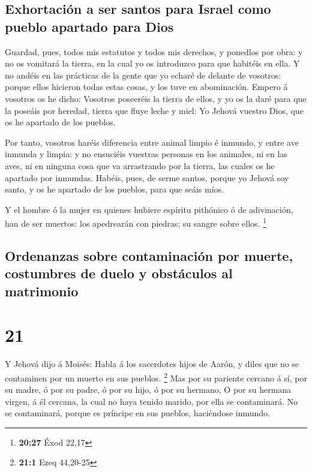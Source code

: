 \hypertarget{exhortaciuxf3n-a-ser-santos-para-israel-como-pueblo-apartado-para-dios}{%
\subsection{Exhortación a ser santos para Israel como pueblo apartado
para
Dios}\label{exhortaciuxf3n-a-ser-santos-para-israel-como-pueblo-apartado-para-dios}}

 Guardad, pues, todos mis estatutos y todos mis derechos,
y ponedlos por obra: y no os vomitará la tierra, en la cual yo os
introduzco para que habitéis en ella.  Y no andéis en las
prácticas de la gente que yo echaré de delante de vosotros: porque ellos
hicieron todas estas cosas, y los tuve en abominación. 
Empero á vosotros os he dicho: Vosotros poseeréis la tierra de ellos, y
yo os la daré para que la poseáis por heredad, tierra que fluye leche y
miel: Yo Jehová vuestro Dios, que os he apartado de los pueblos.

 Por tanto, vosotros haréis diferencia entre animal
limpio é inmundo, y entre ave inmunda y limpia: y no ensuciéis vuestras
personas en los animales, ni en las aves, ni en ninguna cosa que va
arrastrando por la tierra, las cuales os he apartado por inmundas.
 Habéis, pues, de serme santos, porque yo Jehová soy
santo, y os he apartado de los pueblos, para que seáis míos.

 Y el hombre ó la mujer en quienes hubiere espíritu
pithónico ó de adivinación, han de ser muertos: los apedrearán con
piedras; su sangre sobre ellos. \footnote{\textbf{20:27} Éxod 22,17}

\hypertarget{ordenanzas-sobre-contaminaciuxf3n-por-muerte-costumbres-de-duelo-y-obstuxe1culos-al-matrimonio}{%
\subsection{Ordenanzas sobre contaminación por muerte, costumbres de
duelo y obstáculos al
matrimonio}\label{ordenanzas-sobre-contaminaciuxf3n-por-muerte-costumbres-de-duelo-y-obstuxe1culos-al-matrimonio}}

\hypertarget{section-20}{%
\section{21}\label{section-20}}

 Y Jehová dijo á Moisés: Habla á los sacerdotes hijos de
Aarón, y diles que no se contaminen por un muerto en sus pueblos.
\footnote{\textbf{21:1} Ezeq 44,20-25}  Mas por su
pariente cercano á sí, por su madre, ó por su padre, ó por su hijo, ó
por su hermano,  O por su hermana virgen, á él cercana, la
cual no haya tenido marido, por ella se contaminará.  No
se contaminará, porque es príncipe en sus pueblos, haciéndose inmundo.

